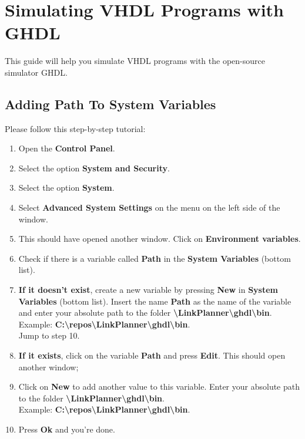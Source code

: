 \chapter{Simulating VHDL Programs with GHDL}

This guide will help you simulate VHDL programs with the open-source simulator GHDL.

\section{Adding Path To System Variables}
Please follow this step-by-step tutorial:
  \begin{enumerate}
    \item Open the \textbf{Control Panel}.
    \item Select the option \textbf{System and Security}.
    \item Select the option \textbf{System}.
    \item Select \textbf{Advanced System Settings} on the menu on the left side of the window.
    \item This should have opened another window. Click on \textbf{Environment variables}.
    \item Check if there is a variable called \textbf{Path} in the \textbf{System Variables} (bottom list).
    \item \textbf{If it doesn't exist}, create a new variable by pressing \textbf{New} in \textbf{System Variables} (bottom list). Insert the name \textbf{Path} as the name of the variable and enter your absolute path to the folder \textbf{\textbackslash{}LinkPlanner\textbackslash{}ghdl\textbackslash{}bin}.\\ Example:
        \textbf{C:\textbackslash{}repos\textbackslash{}LinkPlanner\textbackslash{}ghdl\textbackslash{}bin}.\\
          Jump to step 10.
    \item \textbf{If it exists}, click on the variable \textbf{Path} and press \textbf{Edit}. This should open another window;
    \item Click on \textbf{New} to add another value to this variable. Enter your absolute path to the folder \textbf{\textbackslash{}LinkPlanner\textbackslash{}ghdl\textbackslash{}bin}.\\ Example:
        \textbf{C:\textbackslash{}repos\textbackslash{}LinkPlanner\textbackslash{}ghdl\textbackslash{}bin}.\\
    \item Press \textbf{Ok} and you're done.
  \end{enumerate}
\pagebreak
